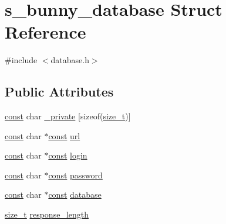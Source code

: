 \hypertarget{structs__bunny__database}{\section{s\-\_\-bunny\-\_\-database Struct Reference}
\label{structs__bunny__database}
}


{\ttfamily \#include $<$database.\-h$>$}

\subsection*{Public Attributes}
\begin{DoxyCompactItemize}
\item 
\hyperlink{term__entry_8h_a57bd63ce7f9a353488880e3de6692d5a}{const} char \hyperlink{structs__bunny__database_adf89f7dc4d038a6d3747c2879e5a1f82}{\-\_\-private} \mbox{[}sizeof(\hyperlink{nc__alloc_8h_a7b60c5629e55e8ec87a4547dd4abced4}{size\-\_\-t})\mbox{]}
\item 
\hyperlink{term__entry_8h_a57bd63ce7f9a353488880e3de6692d5a}{const} char $\ast$\hyperlink{term__entry_8h_a57bd63ce7f9a353488880e3de6692d5a}{const} \hyperlink{structs__bunny__database_ae7dfeb8304165616b036f37ef5a96e1b}{url}
\item 
\hyperlink{term__entry_8h_a57bd63ce7f9a353488880e3de6692d5a}{const} char $\ast$\hyperlink{term__entry_8h_a57bd63ce7f9a353488880e3de6692d5a}{const} \hyperlink{structs__bunny__database_ae394ab01ae57a0d6960d0ca46a7b6384}{login}
\item 
\hyperlink{term__entry_8h_a57bd63ce7f9a353488880e3de6692d5a}{const} char $\ast$\hyperlink{term__entry_8h_a57bd63ce7f9a353488880e3de6692d5a}{const} \hyperlink{structs__bunny__database_a9c512819fcc0e39b657183756e5f83f8}{password}
\item 
\hyperlink{term__entry_8h_a57bd63ce7f9a353488880e3de6692d5a}{const} char $\ast$\hyperlink{term__entry_8h_a57bd63ce7f9a353488880e3de6692d5a}{const} \hyperlink{structs__bunny__database_a10d32b3be7f52966b4835fa27aa04a9c}{database}
\item 
\hyperlink{nc__alloc_8h_a7b60c5629e55e8ec87a4547dd4abced4}{size\-\_\-t} \hyperlink{structs__bunny__database_ae68f626d46bc584f706199401e8e8c8e}{response\-\_\-length}
\end{DoxyCompactItemize}



